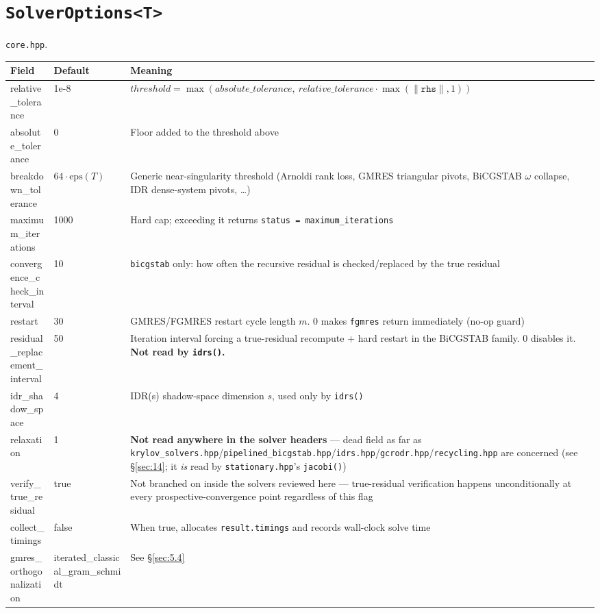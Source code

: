 \documentclass[11pt,a4paper]{report}
\newcommand{\secref}[1]{\S\ref{#1}}
\begin{document}
\section{\texorpdfstring{\lstinline!SolverOptions<T>!}{SolverOptions<T>}}
\label{sec:5.2}

\texttt{core.hpp}.

\begin{longtable}{L{0.30\textwidth}C{0.10\textwidth}P{0.50\textwidth}}
\toprule
Field & Default & Meaning \\
\midrule
\endhead
relative\_tolerance & 1e-8 & $\mathit{threshold} = \max(\mathit{absolute\_tolerance},\ \mathit{relative\_tolerance}\cdot\max(\|\mathtt{rhs}\|,1))$ \\
absolute\_tolerance & 0 & Floor added to the threshold above \\
breakdown\_tolerance & $64\cdot\mathrm{eps}(T)$ & Generic near-singularity threshold (Arnoldi rank loss, GMRES triangular pivots, BiCGSTAB $\omega$ collapse, IDR dense-system pivots, \ldots) \\
maximum\_iterations & 1000 & Hard cap; exceeding it returns \lstinline!status = maximum_iterations! \\
convergence\_check\_interval & 10 & \lstinline!bicgstab! only: how often the recursive residual is checked/replaced by the true residual \\
restart & 30 & GMRES/FGMRES restart cycle length $m$. 0 makes \lstinline!fgmres! return immediately (no-op guard) \\
residual\_replacement\_interval & 50 & Iteration interval forcing a true-residual recompute + hard restart in the BiCGSTAB family. 0 disables it. \textbf{Not read by \lstinline!idrs()!.} \\
idr\_shadow\_space & 4 & IDR(s) shadow-space dimension $s$, used only by \lstinline!idrs()! \\
relaxation & 1 & \textbf{Not read anywhere in the solver headers} --- dead field as far as \texttt{krylov\_solvers.hpp}/\texttt{pipelined\_bicgstab.hpp}/\texttt{idrs.hpp}/\texttt{gcrodr.hpp}/\texttt{recycling.hpp} are concerned (see \secref{sec:14}; it \emph{is} read by \texttt{stationary.hpp}'s \lstinline!jacobi()!) \\
verify\_true\_residual & true & Not branched on inside the solvers reviewed here --- true-residual verification happens unconditionally at every prospective-convergence point regardless of this flag \\
collect\_timings & false & When true, allocates \lstinline!result.timings! and records wall-clock solve time \\
gmres\_orthogonalization & iterated\_classical\_gram\_schmidt & See \secref{sec:5.4} \\
\bottomrule
\end{longtable}
\end{document}
